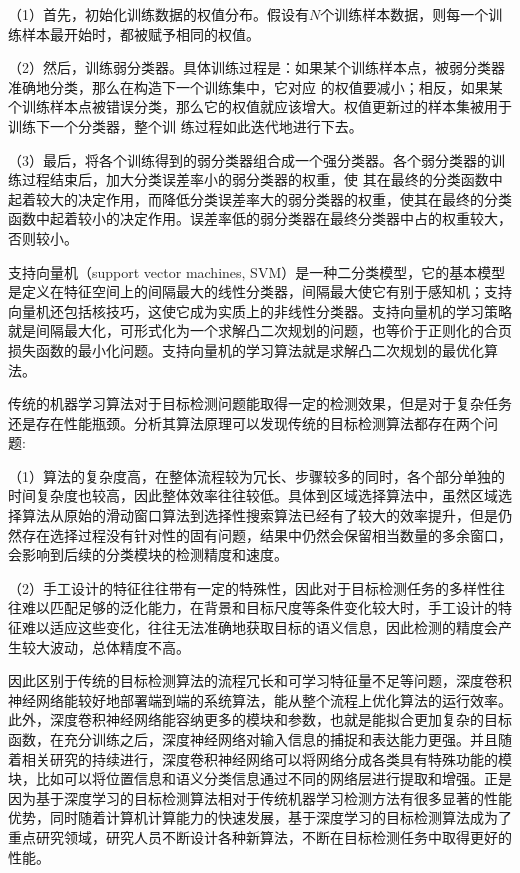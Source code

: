 （1）⾸先，初始化训练数据的权值分布。假设有$N$个训练样本数据，则每⼀个训练样本最开始时，都被赋予相同的权值。

 （2）然后，训练弱分类器。具体训练过程是：如果某个训练样本点，被弱分类器准确地分类，那么在构造下⼀个训练集中，它对应
的权值要减⼩；相反，如果某个训练样本点被错误分类，那么它的权值就应该增⼤。权值更新过的样本集被⽤于训练下⼀个分类器，整个训
练过程如此迭代地进⾏下去。

 （3）最后，将各个训练得到的弱分类器组合成⼀个强分类器。各个弱分类器的训练过程结束后，加⼤分类误差率⼩的弱分类器的权重，使
其在最终的分类函数中起着较⼤的决定作⽤，⽽降低分类误差率⼤的弱分类器的权重，使其在最终的分类函数中起着较⼩的决定作⽤。误差率低的弱分类器在最终分类器中占的权重较⼤，否则较⼩。

支持向量机（support vector machines, SVM）是一种二分类模型，它的基本模型是定义在特征空间上的间隔最大的线性分类器，间隔最大使它有别于感知机；支持向量机还包括核技巧，这使它成为实质上的非线性分类器。支持向量机的学习策略就是间隔最大化，可形式化为一个求解凸二次规划的问题，也等价于正则化的合页损失函数的最小化问题。支持向量机的学习算法就是求解凸二次规划的最优化算法。

传统的机器学习算法对于目标检测问题能取得一定的检测效果，但是对于复杂任务还是存在性能瓶颈。分析其算法原理可以发现传统的目标检测算法都存在两个问题:

（1）算法的复杂度高，在整体流程较为冗长、步骤较多的同时，各个部分单独的时间复杂度也较高，因此整体效率往往较低。具体到区域选择算法中，虽然区域选择算法从原始的滑动窗口算法到选择性搜索算法已经有了较大的效率提升，但是仍然存在选择过程没有针对性的固有问题，结果中仍然会保留相当数量的多余窗口，会影响到后续的分类模块的检测精度和速度。

（2）手工设计的特征往往带有一定的特殊性，因此对于目标检测任务的多样性往往难以匹配足够的泛化能力，在背景和目标尺度等条件变化较大时，手工设计的特征难以适应这些变化，往往无法准确地获取目标的语义信息，因此检测的精度会产生较大波动，总体精度不高。

因此区别于传统的目标检测算法的流程冗长和可学习特征量不足等问题，深度卷积神经网络能较好地部署端到端的系统算法，能从整个流程上优化算法的运行效率。此外，深度卷积神经网络能容纳更多的模块和参数，也就是能拟合更加复杂的目标函数，在充分训练之后，深度神经网络对输入信息的捕捉和表达能力更强。并且随着相关研究的持续进行，深度卷积神经网络可以将网络分成各类具有特殊功能的模块，比如可以将位置信息和语义分类信息通过不同的网络层进行提取和增强。正是因为基于深度学习的目标检测算法相对于传统机器学习检测方法有很多显著的性能优势，同时随着计算机计算能力的快速发展，基于深度学习的目标检测算法成为了重点研究领域，研究人员不断设计各种新算法，不断在目标检测任务中取得更好的性能。

